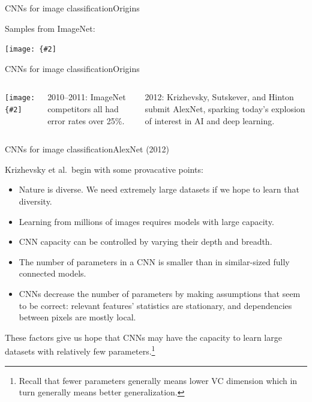 \documentclass[aspectratio=169]{beamer}
\newcommand{\myfig}[3]{\centerline{\texttt{[image: \{\#2]}}}
\begin{document}
\begin{frame}{CNNs for image classification}{Origins}

  Samples from ImageNet:

  \medskip

  \myfig{2.8in}{image-net}{\url{http://image-net.org/explore}}
  
\end{frame}


\begin{frame}{CNNs for image classification}{Origins}

  \begin{columns}

    \column{2.3in}

    \myfig{1.9in}{quartz-imagenet}{\begin{minipage}{2.3in} \url{https://qz.com/1034972/the-data-that-\\changed-the-direction-of-ai-research-\\and-possibly-the-world/} \end{minipage}}

    \column{2.2in}
    
    2010--2011: ImageNet competitors all had error rates over 25\%.

    \medskip

    2012: Krizhevsky, Sutskever, and Hinton submit
    \alert{AlexNet},
    sparking today's explosion of interest in AI and deep learning.

  \end{columns}
  
\end{frame}


\begin{frame}{CNNs for image classification}{AlexNet (2012)}

  Krizhevsky et al.\ begin with some provacative points:
  \begin{itemize}
    \item Nature is diverse. We need \alert{extremely large
      datasets} if we hope to learn that diversity.
    \item Learning from millions of images requires \alert{models with
      large capacity}.
    \item CNN capacity can be controlled by varying their depth and breadth.
    \item The number of parameters in a CNN is smaller than in
      similar-sized fully connected models.
    \item CNNs decrease the number of parameters by making assumptions
      that seem to be correct: relevant features' statistics are
      stationary, and dependencies between pixels are mostly local.
  \end{itemize}

  These factors give us hope that CNNs may have the capacity to learn
  large datasets with relatively few parameters.\footnote{Recall that
    fewer parameters generally means lower VC dimension which in turn
    generally means better generalization.}

\end{frame}
\end{document}
